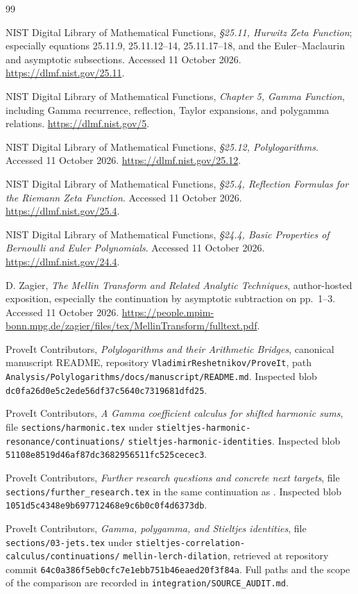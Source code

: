 \documentclass[11pt,letterpaper]{article}
\numberwithin{equation}{section}
\theoremstyle{definition}\newtheorem{definition}[theorem]{Definition}
\theoremstyle{remark}\newtheorem{remark}[theorem]{Remark}
\begin{document}
\begin{thebibliography}{99}
\raggedright
{}
NIST Digital Library of Mathematical Functions,
\emph{\S25.11, Hurwitz Zeta Function}; especially equations 25.11.9,
25.11.12--14, 25.11.17--18, and the Euler--Maclaurin and asymptotic
subsections. Accessed 11 October 2026.
\url{https://dlmf.nist.gov/25.11}.

NIST Digital Library of Mathematical Functions,
\emph{Chapter 5, Gamma Function}, including Gamma recurrence,
reflection, Taylor expansions, and polygamma relations.
\url{https://dlmf.nist.gov/5}.

NIST Digital Library of Mathematical Functions,
\emph{\S25.12, Polylogarithms}. Accessed 11 October 2026.
\url{https://dlmf.nist.gov/25.12}.

NIST Digital Library of Mathematical Functions,
\emph{\S25.4, Reflection Formulas for the Riemann Zeta Function}.
Accessed 11 October 2026.
\url{https://dlmf.nist.gov/25.4}.

NIST Digital Library of Mathematical Functions,
\emph{\S24.4, Basic Properties of Bernoulli and Euler Polynomials}.
Accessed 11 October 2026.
\url{https://dlmf.nist.gov/24.4}.

D. Zagier, \emph{The Mellin Transform and Related Analytic Techniques},
author-hosted exposition, especially the continuation by asymptotic
subtraction on pp.~1--3. Accessed 11 October 2026.
\url{https://people.mpim-bonn.mpg.de/zagier/files/tex/MellinTransform/fulltext.pdf}.

ProveIt Contributors, \emph{Polylogarithms and their Arithmetic Bridges},
canonical manuscript README, repository
\texttt{VladimirReshetnikov/ProveIt}, path
\texttt{Analysis/Polylogarithms/docs/manuscript/README.md}.
Inspected blob \texttt{dc0fa26d0e5c2ede56df37c5640c7319681dfd25}.

ProveIt Contributors, \emph{A Gamma coefficient calculus for shifted
harmonic sums}, file \texttt{sections/harmonic.tex} under
\texttt{stieltjes-harmonic-resonance/continuations/}\allowbreak
\texttt{stieltjes-harmonic-identities}.
Inspected blob \texttt{51108e8519d46af87dc3682956511fc525cecec3}.

ProveIt Contributors, \emph{Further research questions and concrete
next targets}, file \texttt{sections/further\_research.tex} in the
same continuation as \cite{RepoHarmonic}.
Inspected blob \texttt{1051d5c4348e9b697712468e9c6b0c0f4d6373db}.

ProveIt Contributors, \emph{Gamma, polygamma, and Stieltjes identities},
file \texttt{sections/03-jets.tex} under
\texttt{stieltjes-correlation-calculus/continuations/}\allowbreak
\texttt{mellin-lerch-dilation}, retrieved at repository commit
\texttt{64c0a386f5eb0cfc7e1ebb751b46eaed20f3f84a}.
Full paths and the scope of the comparison are recorded in
\texttt{integration/SOURCE\_AUDIT.md}.
\end{thebibliography}
\end{document}
